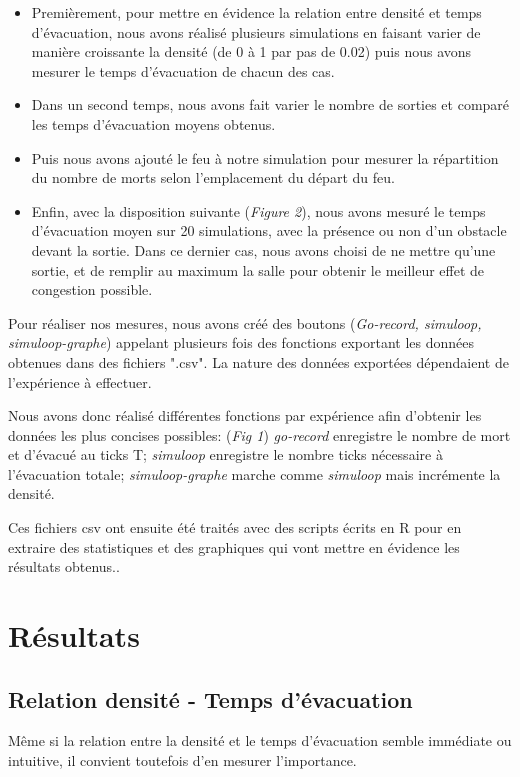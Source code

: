 \documentclass{article}
\begin{document}
\begin{itemize}
\item Premièrement, pour mettre en évidence la relation entre densité et temps d'évacuation, nous avons réalisé plusieurs simulations en faisant varier de manière croissante la densité (de 0 à 1 par pas de 0.02) puis nous avons mesurer le temps d'évacuation de chacun des cas. 

\item Dans un second temps, nous avons fait varier le nombre de sorties et comparé les temps d'évacuation moyens obtenus.

\item Puis nous avons ajouté le feu à notre simulation pour mesurer la répartition du nombre de morts selon l'emplacement du départ du feu.

\item Enfin, avec la disposition suivante ({\it Figure 2}), nous avons mesuré le temps d'évacuation moyen sur 20 simulations, avec la présence ou non d'un obstacle devant la sortie.
Dans ce dernier cas, nous avons choisi de ne mettre qu'une sortie, et de remplir au maximum la salle pour obtenir le meilleur effet de congestion possible.
\end{itemize}

Pour réaliser nos mesures, nous avons créé des boutons ({\it Go-record, simuloop, simuloop-graphe}) appelant plusieurs fois des fonctions exportant les données obtenues dans des fichiers ".csv". 
La nature des données exportées dépendaient de l'expérience à effectuer. 

Nous avons donc réalisé différentes fonctions par expérience afin d'obtenir les données les plus concises possibles: ({\it Fig 1}) {\it go-record} enregistre le nombre de mort et d'évacué au ticks T; {\it simuloop} enregistre le nombre ticks nécessaire à l'évacuation totale; {\it simuloop-graphe} marche comme {\it simuloop} mais incrémente la densité.

Ces fichiers csv ont ensuite été traités avec des scripts écrits en R pour en extraire des statistiques et des graphiques qui vont mettre en évidence les résultats obtenus..

\section{Résultats} 
\subsection{Relation densité - Temps d'évacuation}
Même si la relation entre la densité et le temps d'évacuation semble immédiate ou intuitive, il convient toutefois d'en mesurer l'importance.
\end{document}
